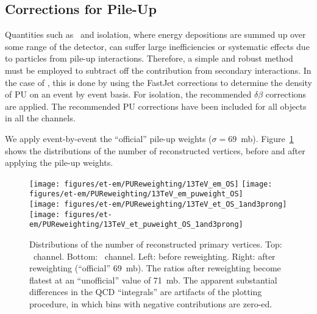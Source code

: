 \subsection{Corrections for Pile-Up}\label{ss:puvalidation}

Quantities such as \MET ~and isolation, where energy depositions are
summed up over some range of the detector, can suffer large
inefficiencies or systematic effects due to particles from pile-up
interactions. Therefore, a simple and robust method must be employed
to subtract off the contribution from secondary interactions.  In the
case of \MET, this is done by using the FastJet corrections to
determine the density of PU on an event by event basis. For isolation, the 
recommended $\delta\beta$ corrections are applied. The
recommended PU corrections have been included for all objects in all
the channels.




We apply event-by-event the ``official'' pile-up weights
($\sigma=69$~mb).  Figure~\ref{fig:nvtx} shows the distributions of
the number of reconstructed vertices, before and after applying the
pile-up weights.

\begin{figure}
  \centering
  \texttt{[image: figures/et-em/PUReweighting/13TeV\_em\_OS]}
  \texttt{[image: figures/et-em/PUReweighting/13TeV\_em\_puweight\_OS]} \\
  \texttt{[image: figures/et-em/PUReweighting/13TeV\_et\_OS\_1and3prong]}
  \texttt{[image: figures/et-em/PUReweighting/13TeV\_et\_puweight\_OS\_1and3prong]} \\
  \caption{\label{fig:nvtx} Distributions of the number of
    reconstructed primary vertices.  Top: \emu ~channel.  Bottom: \etau ~channel.  Left: before reweighting.  Right: after reweighting
    (``official'' 69~mb).  The ratios after reweighting become flatest
    at an ``unofficial'' value of 71~mb.  The apparent substantial
    differences in the QCD ``integrals'' are artifacts of the plotting
    procedure, in which bins with negative contributions are zero-ed.}
\end{figure}
